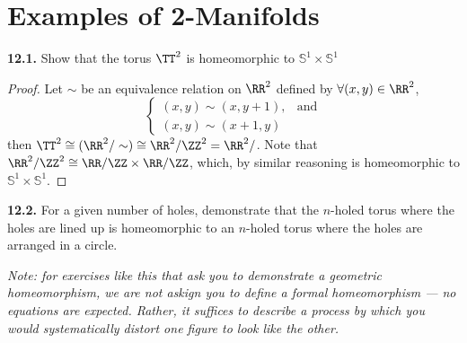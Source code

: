 \documentclass{fkbook}
\newenvironment{problem}[1][Problem \thesection.]
{\noindent\begin{boxedminipage}{\linewidth}\textbf{#1.}}
{\end{boxedminipage}}
\begin{document}
\section{Examples of 2-Manifolds}
\begin{problem}[12.1]
  Show that the torus $\TT^2$ is homeomorphic to $\mathbb{S}^1 \times
  \mathbb{S}^1$
\end{problem}
\begin{proof}
  Let $\sim$ be an equivalence relation on $\RR^2$ defined by $\forall (x,y) \in
  \RR^2$,
  \[
    \begin{cases}
      (x,y) \sim (x,y+1), & \text{and} \\
      (x,y) \sim (x+1, y)
    \end{cases}
  \]
  then $\TT^2 \cong (\RR^2 / \sim) \cong \RR^2 / \ZZ^2 = \RR^2 / $. Note that
  $\RR^2/\ZZ^2 \cong \RR/\ZZ \times \RR/\ZZ$, which, by similar reasoning is
  homeomorphic to $\mathbb{S}^1 \times \mathbb{S}^1$.
\end{proof}
\begin{problem}[12.2]
  For a given number of holes, demonstrate that the $n$-holed torus where the
  holes are lined up is homeomorphic to an $n$-holed torus where the holes are
  arranged in a circle.

  \emph{Note: for exercises like this that ask you to demonstrate a geometric
    homeomorphism, we are not askign you to define a formal homeomorphism --- no
    equations are expected. Rather, it suffices to describe a process by which
    you would systematically distort one figure to look like the other.}
\end{problem}
\end{document}
